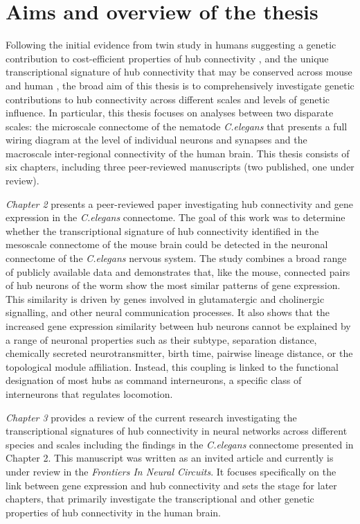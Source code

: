 \section{Aims and overview of the thesis}

Following the initial evidence from twin study in humans suggesting a genetic contribution to cost-efficient properties of hub connectivity \citep{Fornito2011}, and the unique transcriptional signature of hub connectivity that may be conserved across mouse and human \citep{Vertes2016b,Fulcher2016}, the broad aim of this thesis is to comprehensively investigate genetic contributions to hub connectivity across different scales and levels of genetic influence. In particular, this thesis focuses on analyses between two disparate scales: the microscale connectome of the nematode \textit{C.elegans} that presents a full wiring diagram at the level of individual neurons and synapses and the macroscale inter-regional connectivity of the human brain. This thesis consists of six chapters, including three peer-reviewed manuscripts (two published, one under review).

\textit{Chapter 2} presents a peer-reviewed paper investigating hub connectivity and gene expression in the \textit{C.elegans} connectome. The goal of this work was to determine whether the transcriptional signature of hub connectivity identified in the mesoscale connectome of the mouse brain \citep{Fulcher2016} could be detected in the neuronal connectome of the \textit{C.elegans} nervous system. The study combines a broad range of publicly available data and demonstrates that, like the mouse, connected pairs of hub neurons of the worm show the most similar patterns of gene expression. This similarity is driven by genes involved in glutamatergic and cholinergic signalling, and other neural communication processes. It also shows that the increased gene expression similarity between hub neurons cannot be explained by a range of neuronal properties such as their subtype, separation distance, chemically secreted neurotransmitter, birth time, pairwise lineage distance, or the topological module affiliation. Instead, this coupling is linked to the functional designation of most hubs as command interneurons, a specific class of interneurons that regulates locomotion.

\textit{Chapter 3} provides a review of the current research investigating the transcriptional signatures of hub connectivity in neural networks across different species and scales including the findings in the \textit{C.elegans} connectome presented in Chapter 2. This manuscript was written as an invited article and currently is under review in the \textit{Frontiers In Neural Circuits}. It focuses specifically on the link between gene expression and hub connectivity and sets the stage for later chapters, that primarily investigate the transcriptional and other genetic properties of hub connectivity in the human brain.

